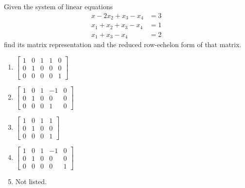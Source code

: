 \begin{problem}
  Given the system of linear equations
  \begin{equation}
    \label{eq:2:1}
    \begin{aligned}
      x-2x_2+x_3-x_4&=3\\
      x_1+x_2+x_3-x_4&=1\\
      x_1+x_3-x_4&=2
    \end{aligned}
  \end{equation}
  find its matrix representation and the reduced row-echelon form of that
  matrix.
  \begin{enumerate}[label=\MakeUppercase{\alph*})]
  \item $\left[
    \begin{smallmatrix}
      1&0&1&1&0\\0&1&0&0&0\\0&0&0&0&1
    \end{smallmatrix}
    \right]$
  \item $\left[
    \begin{smallmatrix}
      1&0&1&-1&0\\0&1&0&0&0\\0&0&0&1&0
    \end{smallmatrix}
    \right]$
  \item $\left[
    \begin{smallmatrix}
      1&0&1&1\\0&1&0&0\\0&0&0&1
    \end{smallmatrix}
    \right]$
    \item $\left[
    \begin{smallmatrix}
      1&0&1&-1&0\\0&1&0&0&0\\0&0&0&0&1
    \end{smallmatrix}
    \right]$
  \item Not listed.
  \end{enumerate}
\end{problem}
